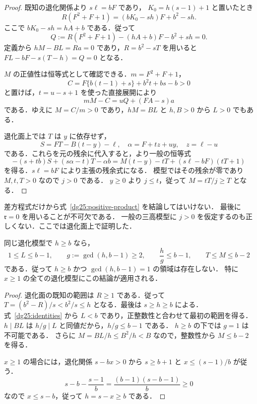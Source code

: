 \begin{proof}
既知の退化関係より $s\ell=bF$ であり，
$K_0=h(s-1)+1$ と置いたとき
\[
 R(F^2+F+1)=(bK_0-sh)F+b^2-sh.
\]
ここで $bK_0-sh=hA+b$ である．従って
\begin{equation}\label{dg25:Q}
 Q:=R(F^2+F+1)-(hA+b)F-b^2+sh=0.
\end{equation}
定義から $hM-BL=Ra=0$ であり，$R=b^2-sT$ を用いると
$FL-bF-s(T-h)=Q=0$ となる．

$M$ の正値性は恒等式として確認できる．$m=F^2+F+1$，
\[
 C=F\{b(t-1)+s\}+b^2t+bs-b>0
\]
と置けば，$t=u-s+1$ を使った直接展開により
\begin{equation}\label{dg25:positive-M}
 mM-C=uQ+(FA-s)a
\end{equation}
である．ゆえに $M=C/m>0$ であり，$hM=BL$ と $h,B>0$ から $L>0$ でもある．

退化面上では $T$ は $y$ に依存せず，
\[
 S=FT-B(t-y)-\ell,\quad
 \alpha=F+tz+uy,\quad z=\ell-u
\]
である．これらを元の残余に代入すると，より一般の恒等式
\begin{equation}\label{dg25:original-identity}
 -(s+tb)S+(s\alpha-t)T-\alpha b
 =M(t-y)-tT+(s\ell-bF)(tT+1)
\end{equation}
を得る．$s\ell=bF$ により主張の残余式になる．
模型ではその残余が零であり $M,t,T>0$ なので $j>0$ である．
$y\ge0$ より $j\le t$，従って $M=tT/j\ge T$ となる．
\end{proof}

差方程式だけから式~\eqref{dg25:positive-product} を結論してはいけない．
最後に $\mathfrak r=0$ を用いることが不可欠である．
一般の三高模型に $j>0$ を仮定するのも正しくない．ここでは退化面上で証明した．

\begin{corollary}[互いに素な領域の無上界排除]
\label{dg25:coprime}
同じ退化模型で $h\ge b$ なら，
\begin{equation}\label{dg25:small-L}
 1\le L\le b-1,\qquad
 g:=\gcd(h,b-1)\ge2,\qquad
 \frac hg\le b-1,\qquad
 T\le M\le b-2
\end{equation}
である．従って $h\ge b$ かつ $\gcd(h,b-1)=1$ の領域は存在しない．
特に $x\ge1$ の全ての退化模型にこの結論が適用される．
\end{corollary}

\begin{proof}
退化面の既知の範囲は $R\ge1$ である．従って
$T=(b^2-R)/s<b^2/s\le h$ となる．最後は $s\ge h\ge b$ による．
式~\eqref{dg25:identities} から $L<b$ であり，正整数性と合わせて最初の範囲を得る．
$h\mid BL$ は $h/g\mid L$ と同値だから，$h/g\le b-1$ である．
$h\ge b$ の下では $g=1$ は不可能である．
さらに $M=BL/h\le B^2/h<B$ なので，整数性から $M\le b-2$ を得る．

$x\ge1$ の場合には，退化関係 $s-bx>0$ から $s\ge b+1$ と
$x\le(s-1)/b$ が従う．
\[
 s-b-\frac{s-1}{b}=\frac{(b-1)(s-b-1)}b\ge0
\]
なので $x\le s-b$，従って $h=s-x\ge b$ である．
\end{proof}

